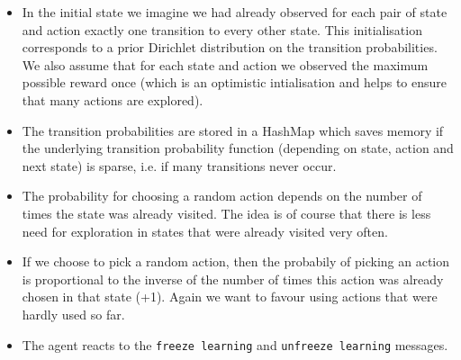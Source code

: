 \documentclass{scrartcl}
\begin{document}
    \begin{itemize}
        \item In the initial state we imagine we had already observed for each pair of state and action exactly one transition to every other state. This initialisation corresponds to a prior Dirichlet distribution on the transition probabilities. We also assume that for each state and action we observed the maximum possible reward once (which is an optimistic intialisation and helps to ensure that many actions are explored).
        \item The transition probabilities are stored in a HashMap which saves memory if the underlying transition probability function (depending on state, action and next state) is sparse, i.e. if many transitions never occur.
        \item The probability for choosing a random action depends on the number of times the state was already visited. The idea is of course that there is less need for exploration in states that were already visited very often.
        \item If we choose to pick a random action, then the probabily of picking an action is proportional to the inverse of the number of times this action was already chosen in that state (+1). Again we want to favour using actions that were hardly used so far.
        \item The agent reacts to the \texttt{freeze learning} and \texttt{unfreeze learning} messages.
    \end{itemize}
\end{document}
